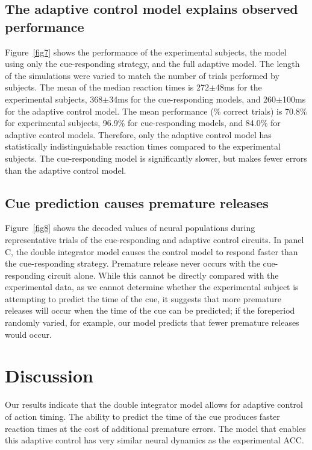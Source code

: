 \documentclass[11pt]{article}
\begin{document}
\subsection{The adaptive control model explains observed performance}

Figure~\ref{fig7} shows the performance
of the experimental subjects,
the model using only the cue-responding strategy,
and the full adaptive model.
The length of the simulations were
varied to match the number of trials
performed by subjects.
The mean of the median reaction times
is 272$\pm$48ms for the experimental subjects,
368$\pm$34ms for the cue-responding models,
and 260$\pm$100ms for the adaptive control model.
The mean performance (\% correct trials) is
70.8\% for experimental subjects,
96.9\% for cue-responding models,
and 84.0\% for adaptive control models.
Therefore, only the adaptive control model
has statistically indistinguishable reaction times
compared to the experimental subjects.
The cue-responding model is significantly slower,
but makes fewer errors than the adaptive control model.

\subsection{Cue prediction causes premature releases}

Figure~\ref{fig8} shows the decoded values
of neural populations during representative trials
of the cue-responding and adaptive control circuits.
In panel C, the double integrator model
causes the control model to respond faster than
the cue-responding strategy.
Premature release never occurs with
the cue-responding circuit alone.
While this cannot be directly compared
with the experimental data,
as we cannot determine
whether the experimental subject
is attempting to
predict the time of the cue,
it suggests that more premature
releases will occur when the time of the cue
can be predicted;
if the foreperiod randomly varied, for example,
our model predicts that fewer premature
releases would occur.

\section{Discussion}

Our results indicate that the double integrator model
allows for adaptive control of action timing.
The ability to predict the time of the cue
produces faster reaction times at the cost
of additional premature errors.
The model that enables this adaptive control
has very similar neural dynamics
as the experimental ACC.
\end{document}
